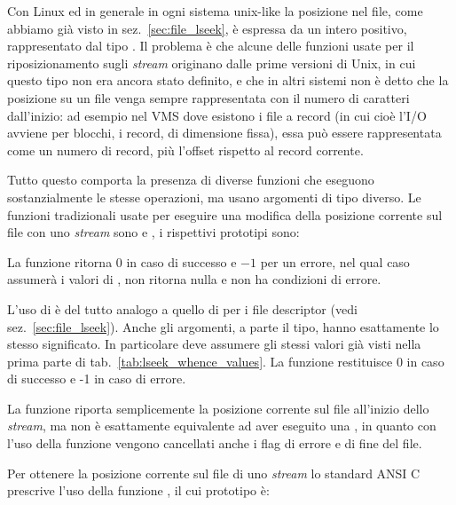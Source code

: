 Con Linux ed in generale in ogni sistema unix-like la posizione nel file, come
abbiamo già visto in sez.~\ref{sec:file_lseek}, è espressa da un intero
positivo, rappresentato dal tipo . Il problema è che alcune delle
funzioni usate per il riposizionamento sugli \textit{stream} originano dalle
prime versioni di Unix, in cui questo tipo non era ancora stato definito, e
che in altri sistemi non è detto che la posizione su un file venga sempre
rappresentata con il numero di caratteri dall'inizio: ad esempio nel VMS dove
esistono i file a record (in cui cioè l'I/O avviene per blocchi, i record, di
dimensione fissa), essa può essere rappresentata come un numero di record, più
l'offset rispetto al record corrente.

Tutto questo comporta la presenza di diverse funzioni che eseguono
sostanzialmente le stesse operazioni, ma usano argomenti di tipo diverso. Le
funzioni tradizionali usate per eseguire una modifica della posizione corrente
sul file con uno \textit{stream} sono  e , i
rispettivi prototipi sono:

\begin{funcproto}{
}

{La funzione  ritorna $0$ in caso di successo e $-1$ per un
  errore, nel qual caso  assumerà i valori di ,
   non ritorna nulla e non ha condizioni di errore.}
\end{funcproto}

L'uso di  è del tutto analogo a quello di  per i file
descriptor (vedi sez.~\ref{sec:file_lseek}). Anche gli argomenti, a parte il
tipo, hanno esattamente lo stesso significato. In particolare 
deve assumere gli stessi valori già visti nella prima parte di
tab.~\ref{tab:lseek_whence_values}.  La funzione restituisce 0 in caso di
successo e -1 in caso di errore.

La funzione  riporta semplicemente la posizione corrente sul file
all'inizio dello \textit{stream}, ma non è esattamente equivalente ad aver
eseguito una , in quanto con l'uso della
funzione vengono cancellati anche i flag di errore e di fine del file.

Per ottenere la posizione corrente sul file di uno \textit{stream} lo standard
ANSI C prescrive l'uso della funzione , il cui prototipo è:

